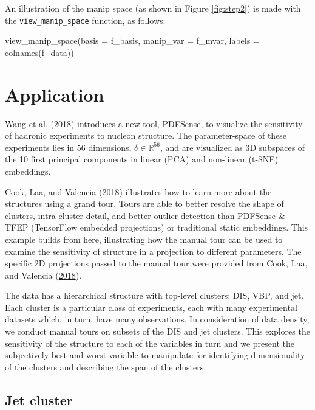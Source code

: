\noindent An illustration of the manip space (as shown in Figure
\ref{fig:step2}) is made with the \texttt{view\_manip\_space} function,
as follows:

\begin{Schunk}
\begin{Sinput}
view_manip_space(basis = f_basis, 
                 manip_var = f_mvar, 
                 labels = colnames(f_data))
\end{Sinput}
\end{Schunk}

\hypertarget{sec:application}{%
\section{Application}\label{sec:application}}

Wang et al. (\protect\hyperlink{ref-wang_mapping_2018}{2018}) introduces
a new tool, PDFSense, to visualize the sensitivity of hadronic
experiments to nucleon structure. The parameter-space of these
experiments lies in 56 dimensions, \(\delta \in \mathbb{R}^{56}\), and
are visualized as 3D subspaces of the 10 first principal components in
linear (PCA) and non-linear (t-SNE) embeddings.

Cook, Laa, and Valencia
(\protect\hyperlink{ref-cook_dynamical_2018}{2018}) illustrates how to
learn more about the structures using a grand tour. Tours are able to
better resolve the shape of clusters, intra-cluster detail, and better
outlier detection than PDFSense \& TFEP (TensorFlow embedded
projections) or traditional static embeddings. This example builds from
here, illustrating how the manual tour can be used to examine the
sensitivity of structure in a projection to different parameters. The
specific 2D projections passed to the manual tour were provided from
Cook, Laa, and Valencia
(\protect\hyperlink{ref-cook_dynamical_2018}{2018}).

The data has a hierarchical structure with top-level clusters; DIS, VBP,
and jet. Each cluster is a particular class of experiments, each with
many experimental datasets which, in turn, have many observations. In
consideration of data density, we conduct manual tours on subsets of the
DIS and jet clusters. This explores the sensitivity of the structure to
each of the variables in turn and we present the subjectively best and
worst variable to manipulate for identifying dimensionality of the
clusters and describing the span of the clusters.

\hypertarget{jet-cluster}{%
\subsection{Jet cluster}\label{jet-cluster}}

